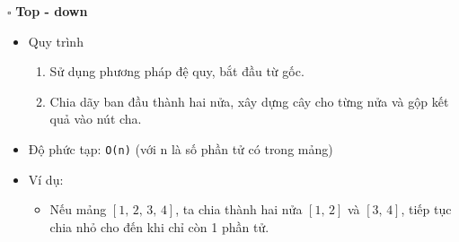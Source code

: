 \documentclass[a4paper]{article}
\begin{document}
\noindent $\square$ \textbf{Top - down}
\begin{itemize}[label = $\circ$]
    \item Quy trình
    \begin{enumerate}
        \item Sử dụng phương pháp đệ quy, bắt đầu từ gốc.
        \item Chia dãy ban đầu thành hai nửa, xây dựng cây cho từng nửa và gộp kết quả vào nút cha.
    \end{enumerate}
    \item Độ phức tạp: \texttt{O(n)} (với n là số phần tử có trong mảng)
    \item Ví dụ:
    \begin{itemize}[label = $\bullet$]
        \item Nếu mảng $[1,\,2,\,3,\,4]$, ta chia thành hai nửa $[1,\,2]$ và $[3,\,4]$, tiếp tục chia nhỏ cho đến khi chỉ còn 1 phần tử.
    \end{itemize}
\end{itemize}
\end{document}
